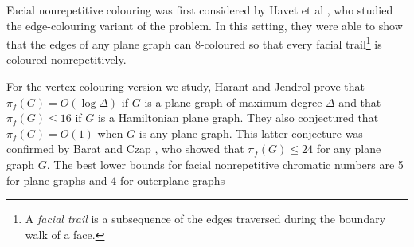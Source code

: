 \documentclass{patmorin}
\begin{document}
Facial nonrepetitive colouring was first considered by Havet et al
\cite{havet2011facial}, who studied the edge-colouring variant of
the problem.  In this setting, they were able to show that the edges
of any plane graph can 8-coloured so that every facial trail\footnote{A
\emph{facial trail} is a subsequence of the edges traversed during the
boundary walk of a face.} is coloured nonrepetitively. 

For the vertex-colouring version we study, Harant and Jendrol prove
that $\pi_f(G)=O(\log\Delta)$ if $G$ is a plane graph of maximum
degree $\Delta$ and that $\pi_f(G)\le 16$ if $G$ is a Hamiltonian
plane graph.  They also conjectured that $\pi_f(G)=O(1)$ when $G$
is any plane graph.  This latter conjecture was confirmed by Barat
and Czap \cite{barat2007square}, who showed that $\pi_f(G)\le 24$ for
any plane graph $G$.  The best lower bounds for facial nonrepetitive
chromatic numbers are 5 for plane graphs and 4 for outerplane graphs
\cite{barat2013facial}


%
 
\end{document}
